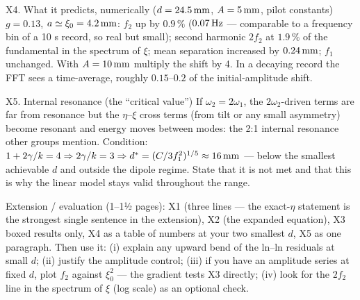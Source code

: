 \documentclass[11pt,a4paper]{article}
\begin{document}
\begin{stepbox}{X4. What it predicts, numerically ($d=24.5\,\mathrm{mm}$, $A=5\,\mathrm{mm}$, pilot constants)}
$g=0.13$, $a\simeq\xi_0=4.2\,\mathrm{mm}$: $f_2$ up by $0.9\,\%$ ($0.07\,\mathrm{Hz}$ --- comparable to a frequency bin of a 10 s record, so real but small); second harmonic $2f_2$ at $1.9\,\%$ of the fundamental in the spectrum of $\xi$; mean separation increased by $0.24\,\mathrm{mm}$; $f_1$ unchanged. With $A=10\,\mathrm{mm}$ multiply the shift by 4. In a decaying record the FFT sees a time-average, roughly $0.15$--$0.2$ of the initial-amplitude shift.
\end{stepbox}
\begin{stepbox}{X5. Internal resonance (the ``critical value'')}
If $\omega_2=2\omega_1$, the $2\omega_2$-driven terms are far from resonance but the $\eta$--$\xi$ cross terms (from tilt or any small asymmetry) become resonant and energy moves between modes: the 2:1 internal resonance other groups mention. Condition: $1+2\gamma/k=4\Rightarrow2\gamma/k=3\Rightarrow d^*=(C/3f_1^2)^{1/5}\approx16\,\mathrm{mm}$ --- below the smallest achievable $d$ and outside the dipole regime. State that it is not met and that this is why the linear model stays valid throughout the range.
\end{stepbox}
\begin{writebox}
Extension / evaluation (1--1½ pages): X1 (three lines --- the exact-$\eta$ statement is the strongest single sentence in the extension), X2 (the expanded equation), X3 boxed results only, X4 as a table of numbers at your two smallest $d$, X5 as one paragraph. Then use it: (i) explain any upward bend of the ln--ln residuals at small $d$; (ii) justify the amplitude control; (iii) if you have an amplitude series at fixed $d$, plot $f_2$ against $\xi_0^2$ --- the gradient tests X3 directly; (iv) look for the $2f_2$ line in the spectrum of $\xi$ (log scale) as an optional check.
\end{writebox}
\end{document}
